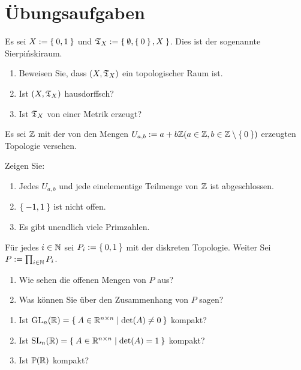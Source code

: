 \clearpage
\section*{Übungsaufgaben}

\begin{aufgabe}[Sierpińskiraum]\label{ub1:aufg1}
    Es sei $X := \Set{0,1}$ und $\mathfrak{T}_X := \Set{\emptyset, \Set{0}, X}$.
    Dies ist der sogenannte Sierpińskiraum.
    \begin{enumerate}[label=(\alph*)]
        \item Beweisen Sie, dass $(X, \mathfrak{T}_X)$ ein topologischer Raum ist.
        \item Ist $(X, \mathfrak{T}_X)$ hausdorffsch?
        \item Ist $\mathfrak{T}_X$ von einer Metrik erzeugt?
    \end{enumerate}
\end{aufgabe}

\begin{aufgabe}\label{ub1:aufg4}
    Es sei $\mathbb{Z}$ mit der von den Mengen $U_{a,b} := a + b \mathbb{Z} (a \in \mathbb{Z}, b \in \mathbb{Z} \setminus \Set{0})$
    erzeugten Topologie versehen.

    Zeigen Sie:
    \begin{enumerate}[label=(\alph*)]
        \item Jedes $U_{a,b}$ und jede einelementige Teilmenge von $\mathbb{Z}$ ist abgeschlossen.
        \item $\Set{-1, 1}$ ist nicht offen.
        \item Es gibt unendlich viele Primzahlen.
    \end{enumerate}
\end{aufgabe}

\begin{aufgabe}\label{ub2:aufg4}
    Für jedes $i \in \mathbb{N}$ sei $P_i := \Set{0,1}$ mit der diskreten
    Topologie. Weiter Sei $P := \prod_{i \in \mathbb{N}} P_i$.

    \begin{enumerate}[label=(\alph*)]
        \item Wie sehen die offenen Mengen von $P$ aus?
        \item Was können Sie über den Zusammenhang von $P$ sagen?
    \end{enumerate}
\end{aufgabe}

\begin{aufgabe}[Kompaktheit]\label{ub2:aufg3.1}
    \begin{enumerate}[label=(\alph*)]
        \item Ist $\text{GL}_n(\mathbb{R}) = \Set{A \in \ensuremath{\mathbb{R}}^{n \times n} | \det(A) \neq 0}$ kompakt?
        \item Ist $\text{SL}_n(\mathbb{R}) = \Set{A \in \ensuremath{\mathbb{R}}^{n \times n} | \det(A) = 1}$ kompakt?
        \item Ist $\mathbb{P}(\mathbb{R})$ kompakt?
    \end{enumerate}
\end{aufgabe}
